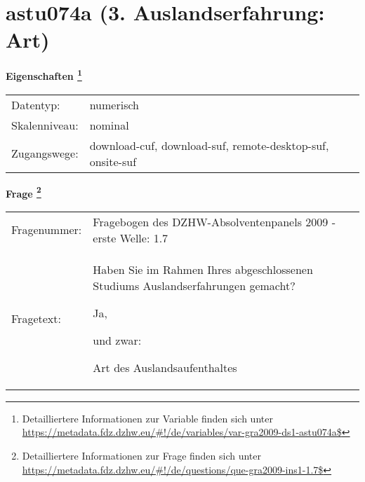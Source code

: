 
    \setcounter{footnote}{0}

    \vspace*{-1.8cm}
	\section{astu074a (3. Auslandserfahrung: Art)}
	\label{section:astu074a}



    \vspace*{0.5cm}
    \noindent\textbf{Eigenschaften
	\footnote{Detailliertere Informationen zur Variable finden sich unter
		\url{https://metadata.fdz.dzhw.eu/\#!/de/variables/var-gra2009-ds1-astu074a$}}}\\
	\begin{tabularx}{\hsize}{@{}lX}
	Datentyp: & numerisch \\
	Skalenniveau: & nominal \\
	Zugangswege: &
	  download-cuf, 
	  download-suf, 
	  remote-desktop-suf, 
	  onsite-suf
 \\
    \end{tabularx}



				\vspace*{0.5cm}
                \noindent\textbf{Frage
	                \footnote{Detailliertere Informationen zur Frage finden sich unter
		              \url{https://metadata.fdz.dzhw.eu/\#!/de/questions/que-gra2009-ins1-1.7$}}}\\
				\begin{tabularx}{\hsize}{@{}lX}
					Fragenummer: &
					  Fragebogen des DZHW-Absolventenpanels 2009 - erste Welle:
					  1.7
 \\
					Fragetext: & Haben Sie im Rahmen Ihres abgeschlossenen Studiums Auslandserfahrungen gemacht?\par  Ja,\par  und zwar:\par  Art des Auslandsaufenthaltes \\
				\end{tabularx}





